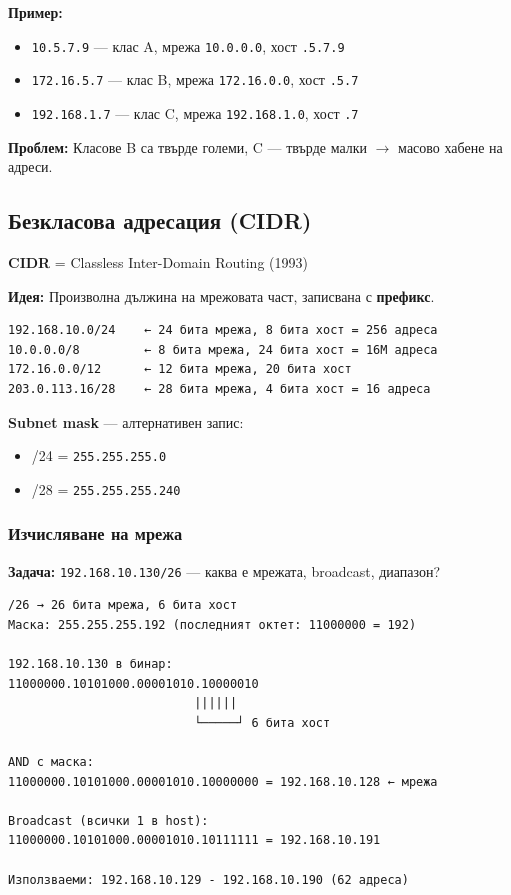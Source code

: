 \documentclass[12pt,a4paper]{article}
\begin{document}
\textbf{Пример:}
\begin{itemize}
    \item \texttt{10.5.7.9} — клас A, мрежа \texttt{10.0.0.0}, хост \texttt{.5.7.9}
    \item \texttt{172.16.5.7} — клас B, мрежа \texttt{172.16.0.0}, хост \texttt{.5.7}
    \item \texttt{192.168.1.7} — клас C, мрежа \texttt{192.168.1.0}, хост \texttt{.7}
\end{itemize}

\textbf{Проблем:} Класове B са твърде големи, C — твърде малки $\rightarrow$ масово хабене на адреси.

\subsection{Безкласова адресация (CIDR)}

\textbf{CIDR} = Classless Inter-Domain Routing (1993)

\textbf{Идея:} Произволна дължина на мрежовата част, записвана с \textbf{префикс}.

\begin{lstlisting}
192.168.10.0/24    ← 24 бита мрежа, 8 бита хост = 256 адреса
10.0.0.0/8         ← 8 бита мрежа, 24 бита хост = 16M адреса
172.16.0.0/12      ← 12 бита мрежа, 20 бита хост
203.0.113.16/28    ← 28 бита мрежа, 4 бита хост = 16 адреса
\end{lstlisting}

\textbf{Subnet mask} — алтернативен запис:
\begin{itemize}
    \item /24 = \texttt{255.255.255.0}
    \item /28 = \texttt{255.255.255.240}
\end{itemize}

\subsubsection{Изчисляване на мрежа}

\textbf{Задача:} \texttt{192.168.10.130/26} — каква е мрежата, broadcast, диапазон?

\begin{lstlisting}
/26 → 26 бита мрежа, 6 бита хост
Маска: 255.255.255.192 (последният октет: 11000000 = 192)

192.168.10.130 в бинар:
11000000.10101000.00001010.10000010
                          ||||||
                          └─────┘ 6 бита хост

AND с маска:
11000000.10101000.00001010.10000000 = 192.168.10.128 ← мрежа

Broadcast (всички 1 в host):
11000000.10101000.00001010.10111111 = 192.168.10.191

Използваеми: 192.168.10.129 - 192.168.10.190 (62 адреса)
\end{lstlisting}
\end{document}
